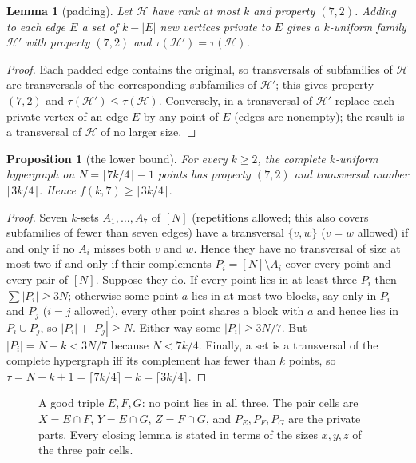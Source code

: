 \documentclass[11pt]{amsart}
\newtheorem{lemma}[theorem]{Lemma}
\newtheorem{proposition}[theorem]{Proposition}
\theoremstyle{definition}
\theoremstyle{remark}
\newcommand{\cH}{\mathcal H}
\newcommand{\ceil}[1]{\lceil #1\rceil}
\begin{document}
\begin{lemma}[padding]\label{lem:pad}
Let $\cH$ have rank at most $k$ and property $(7,2)$. Adding to each edge $E$ a set of $k-|E|$ new vertices private to $E$ gives a $k$-uniform family $\cH'$ with property $(7,2)$ and $\tau(\cH')=\tau(\cH)$.
\end{lemma}
\begin{proof}
Each padded edge contains the original, so transversals of subfamilies of $\cH$ are transversals of the corresponding subfamilies of $\cH'$; this gives property $(7,2)$ and $\tau(\cH')\le\tau(\cH)$. Conversely, in a transversal of $\cH'$ replace each private vertex of an edge $E$ by any point of $E$ (edges are nonempty); the result is a transversal of $\cH$ of no larger size.
\end{proof}

\begin{proposition}[the lower bound]\label{prop:lower}
For every $k\ge2$, the complete $k$-uniform hypergraph on $N=\ceil{7k/4}-1$ points has property $(7,2)$ and transversal number $\ceil{3k/4}$. Hence $f(k,7)\ge\ceil{3k/4}$.
\end{proposition}
\begin{proof}
Seven $k$-sets $A_1,\dots,A_7$ of $[N]$ (repetitions allowed; this also covers subfamilies of fewer than seven edges) have a transversal $\{v,w\}$ ($v=w$ allowed) if and only if no $A_i$ misses both $v$ and $w$. Hence they have no transversal of size at most two if and only if their complements $P_i=[N]\setminus A_i$ cover every point and every pair of $[N]$. Suppose they do. If every point lies in at least three $P_i$ then $\sum|P_i|\ge3N$; otherwise some point $a$ lies in at most two blocks, say only in $P_i$ and $P_j$ ($i=j$ allowed), every other point shares a block with $a$ and hence lies in $P_i\cup P_j$, so $|P_i|+|P_j|\ge N$. Either way some $|P_i|\ge3N/7$. But $|P_i|=N-k<3N/7$ because $N<7k/4$. Finally, a set is a transversal of the complete hypergraph iff its complement has fewer than $k$ points, so $\tau=N-k+1=\ceil{7k/4}-k=\ceil{3k/4}$.
\end{proof}


\begin{figure}[t]
\centering
{}
\caption{A good triple $E,F,G$: no point lies in all three. The pair cells are $X=E\cap F$, $Y=E\cap G$, $Z=F\cap G$, and $P_E,P_F,P_G$ are the private parts. Every closing lemma is stated in terms of the sizes $x,y,z$ of the three pair cells.}\label{fig:triple}
\end{figure}
\end{document}
